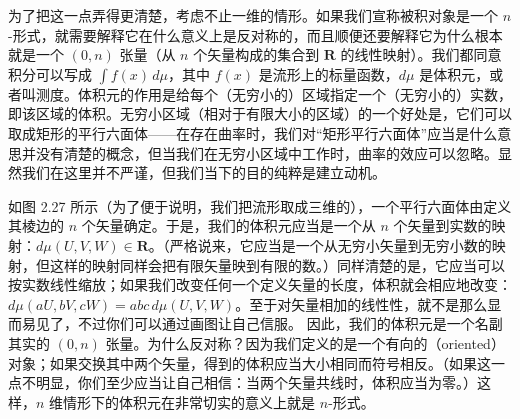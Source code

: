 为了把这一点弄得更清楚，考虑不止一维的情形。如果我们宣称被积对象是一个 $n$-形式，就需要解释它在什么意义上是反对称的，而且顺便还要解释它为什么根本就是一个 $(0,n)$ 张量（从 $n$ 个矢量构成的集合到 $\mathbf{R}$ 的线性映射）。我们都同意积分可以写成 $\int f(x)\,d\mu$，其中 $f(x)$ 是流形上的标量函数，$d\mu$ 是体积元，或者叫测度。体积元的作用是给每个（无穷小的）区域指定一个（无穷小的）实数，即该区域的体积。无穷小区域（相对于有限大小的区域）的一个好处是，它们可以取成矩形的平行六面体——在存在曲率时，我们对“矩形平行六面体”应当是什么意思并没有清楚的概念，但当我们在无穷小区域中工作时，曲率的效应可以忽略。显然我们在这里并不严谨，但我们当下的目的纯粹是建立动机。

如图 2.27 所示（为了便于说明，我们把流形取成三维的），一个平行六面体由定义其棱边的 $n$ 个矢量确定。于是，我们的体积元应当是一个从 $n$ 个矢量到实数的映射：$d\mu(U,V,W)\in\mathbf{R}$。（严格说来，它应当是一个从无穷小矢量到无穷小数的映射，但这样的映射同样会把有限矢量映到有限的数。）同样清楚的是，它应当可以按实数线性缩放；如果我们改变任何一个定义矢量的长度，体积就会相应地改变：$d\mu(aU,bV,cW)=abc\,d\mu(U,V,W)$。至于对矢量相加的线性性，就不是那么显而易见了，不过你们可以通过画图让自己信服。
因此，我们的体积元是一个名副其实的 $(0,n)$ 张量。为什么反对称？因为我们定义的是一个有向的（oriented）对象；如果交换其中两个矢量，得到的体积应当大小相同而符号相反。（如果这一点不明显，你们至少应当让自己相信：当两个矢量共线时，体积应当为零。）这样，$n$ 维情形下的体积元在非常切实的意义上就是 $n$-形式。

